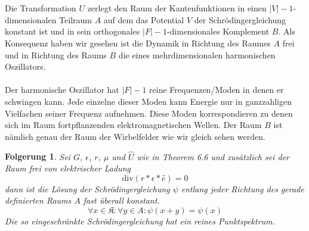 \documentclass[11pt,a4paper,leqno]{report}
\newtheorem{corollary}[theorem]{Folgerung}
\numberwithin{equation}{chapter}
\begin{document}
\\
\\
Die Transformation $U$ zerlegt den Raum der Kantenfunktionen in einen $|V| - 1$-dimensionalen Teilraum $A$ auf dem das Potential $V$ der Schr\"odingergleichung konstant ist und in sein orthogonales $|F| - 1$-dimensionales Komplement $B$. Als Konsequenz haben wir gesehen ist die Dynamik in Richtung des Raumes $A$ frei und in Richtung des Raums $B$ die eines mehrdimensionalen harmonischen Oszillators.\\
\\
Der harmonische Oszillator hat $|F| - 1$ reine Frequenzen/Moden in denen er schwingen kann. Jede einzelne dieser Moden kann Energie nur in ganzzahligen Vielfachen seiner Frequenz aufnehmen. Diese Moden korrespondieren zu denen sich im Raum fortpflanzenden elektromagnetischen Wellen. Der Raum $B$ ist n\"amlich genau der Raum der Wirbelfelder wie wir gleich sehen werden.
\begin{corollary}
	Sei $G$, $\epsilon$, $r$, $\mu$ und $\hat{U}$ wie in Theorem 6.6 und zus\"atzlich sei der Raum frei von elektrischer Ladung
	\begin{equation}
		\text{div}(r * \epsilon * \hat{e}) = 0
	\end{equation}
	dann ist die L\"osung der Schr\"odingergleichung $\psi$ entlang jeder Richtung des gerade definierten Raums $A$  fast \"uberall konstant.
	\begin{equation}
		\forall x\in \mathfrak{K}:\forall y\in A: \psi(x+y)=\psi(x)
	\end{equation}
	Die so eingeschr\"ankte Schr\"odingergleichung hat ein reines Punktspektrum.
\end{corollary} 
\end{document}

